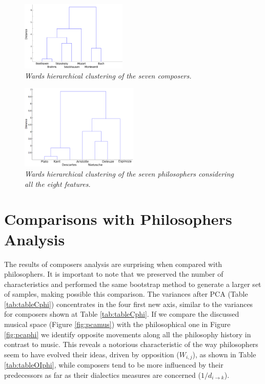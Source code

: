 \documentclass[
 aip,
 jmp,
 amsmath,amssymb,
 reprint,
]{revtex4-1}
\begin{document}
\begin{figure}[ht]
        \begin{center}
          \includegraphics[width=0.45\textwidth]{Clust_Compositores.eps}
        \end{center}
        \caption{\it Wards hierarchical clustering of the seven composers.}
        \label{fig:dendrogrammus}
\end{figure}

\begin{figure}
        \begin{center}
                \includegraphics[width=0.5\textwidth]{Dendrogram_.eps}
        \end{center}
        \caption{\it Wards  hierarchical clustering of the seven
                    philosophers considering all the eight features.}
        \label{fig:dendrogramphi}
\end{figure}

\section{Comparisons with Philosophers Analysis}

The results of composers analysis are surprising when compared with philosophers. It is important to note that we preserved the
number of characteristics and performed the same bootstrap method to
generate a larger set of samples, making possible this
comparison. The variances after PCA (Table \ref{tab:tableCphi}) concentrates in the four first new axis, similar to the variances for composers shown at Table \ref{tab:tableCphi}. If we compare the discussed musical space (Figure \ref{fig:pcamus})
with the philosophical one in Figure \ref{fig:pcaphi} we
identify opposite movements along all the philosophy history in contrast
to music. This reveals a notorious characteristic of the way
philosophers seem to have evolved their ideas, driven by opposition ($W_{i,j}$), as shown in Table \ref{tab:tableOIphi}, while
composers tend to be more influenced by their predecessors as far as their dialectics measures are
concerned ($1/d_{i \rightarrow k}$).
\end{document}
